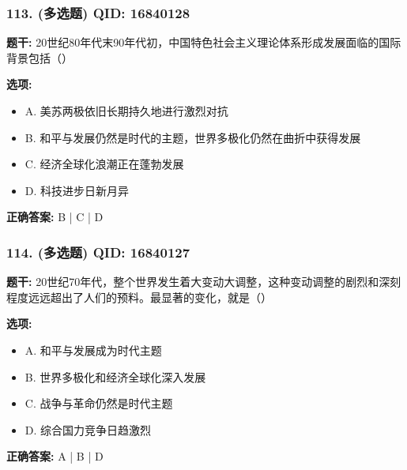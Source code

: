 \documentclass[12pt,UTF8]{ctexart}
\begin{document}
\subsubsection*{113. (多选题) \small QID: 16840128}

\textbf{题干:}
20世纪80年代末90年代初，中国特色社会主义理论体系形成发展面临的国际背景包括（）

\textbf{选项:}
\begin{itemize}[leftmargin=*]

  \item A. 美苏两极依旧长期持久地进行激烈对抗

  \item B. 和平与发展仍然是时代的主题，世界多极化仍然在曲折中获得发展

  \item C. 经济全球化浪潮正在蓬勃发展

  \item D. 科技进步日新月异

\end{itemize}

\textbf{正确答案:}
B | C | D

\vspace{0.3em}\hrulefill\vspace{0.7em}

\subsubsection*{114. (多选题) \small QID: 16840127}

\textbf{题干:}
20世纪70年代，整个世界发生着大变动大调整，这种变动调整的剧烈和深刻程度远远超出了人们的预料。最显著的变化，就是（）

\textbf{选项:}
\begin{itemize}[leftmargin=*]

  \item A. 和平与发展成为时代主题

  \item B. 世界多极化和经济全球化深入发展

  \item C. 战争与革命仍然是时代主题

  \item D. 综合国力竞争日趋激烈

\end{itemize}

\textbf{正确答案:}
A | B | D

\vspace{0.3em}\hrulefill\vspace{0.7em}
\end{document}
